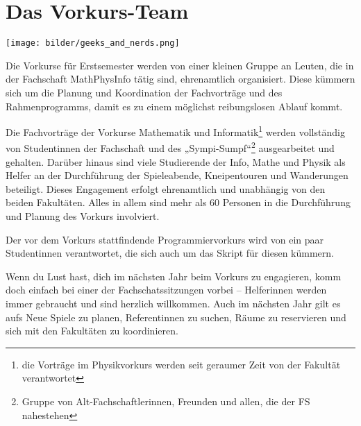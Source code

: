 \vspace{-3mm}

\section{Das Vorkurs-Team}
\vspace{-1mm}

\begin{figure*}[!b]
    \centering
    \texttt{[image: bilder/geeks\_and\_nerds.png]}
\end{figure*}

Die Vorkurse für Erstsemester werden von einer kleinen Gruppe an Leuten, die in der Fachschaft MathPhysInfo tätig sind, ehrenamtlich organisiert. Diese kümmern sich um die Planung und Koordination der Fachvorträge und des Rahmenprogramms, damit es zu einem möglichst reibungslosen Ablauf kommt.

Die Fachvorträge der Vorkurse Mathematik und Informatik\footnote{die Vorträge im Physikvorkurs werden seit geraumer Zeit von der Fakultät verantwortet} werden vollständig von Studentinnen der Fachschaft und des „Sympi-Sumpf“\footnote{Gruppe von Alt-Fachschaftlerinnen, Freunden und allen, die der FS nahestehen} ausgearbeitet und gehalten. Darüber hinaus sind viele Studierende der Info, Mathe und Physik als Helfer an der Durchführung der Spieleabende, Kneipentouren und Wanderungen beteiligt. Dieses Engagement erfolgt ehrenamtlich und unabhängig von den beiden Fakultäten. Alles in allem sind mehr als 60 Personen in die Durchführung und Planung des Vorkurs involviert.

Der vor dem Vorkurs stattfindende Programmiervorkurs wird von ein paar Studentinnen verantwortet, die sich auch um das Skript für diesen kümmern.

Wenn du Lust hast, dich im nächsten Jahr beim Vorkurs zu engagieren, komm doch einfach bei einer der Fachschatssitzungen vorbei -- Helferinnen werden immer gebraucht und sind herzlich willkommen. Auch im nächsten Jahr gilt es aufs Neue Spiele zu planen, Referentinnen zu suchen, Räume zu reservieren und sich mit den Fakultäten zu koordinieren.

\vfill\eject
